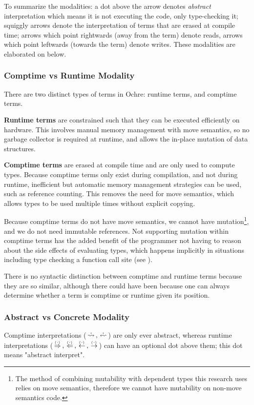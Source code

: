 \documentclass[12pt,twoside]{report}
\begin{document}
To summarize the modalities: a dot above the arrow denotes \textit{abstract} interpretation which means it is not executing the code, only type-checking it; squiggly arrows denote the interpretation of terms that are erased at compile time; arrows which point rightwards (away from the term) denote reads, arrows which point leftwards (towards the term) denote writes. These modalities are elaborated on below.

\subsubsection{Comptime vs Runtime Modality}
There are two distinct types of terms in Ochre: runtime terms, and comptime terms.

\textbf{Runtime terms} are constrained such that they can be executed efficiently on hardware. This involves manual memory management with move semantics, so no garbage collector is required at runtime, and allows the in-place mutation of data structures.

\textbf{Comptime terms} are erased at compile time and are only used to compute types. Because comptime terms only exist during compilation, and not during runtime, inefficient but automatic memory management strategies can be used, such as reference counting. This removes the need for move semantics, which allows types to be used multiple times without explicit copying.

Because comptime terms do not have move semantics, we cannot have mutation\footnote{The method of combining mutability with dependent types this research uses relies on move semantics, therefore we cannot have mutability on non-move semantics code.}, and we do not need immutable references. Not supporting mutation within comptime terms has the added benefit of the programmer not having to reason about the side effects of evaluating types, which happens implicitly in situations including type checking a function call site (see ).
 
There is no syntactic distinction between comptime and runtime terms because they are so similar, although there could have been because one can always determine whether a term is comptime or runtime given its position.

\subsubsection{Abstract vs Concrete Modality}
Comptime interpretations ($\erasedreadarrow, \erasedwritearrow$) are only ever abstract, whereas runtime interpretations ($\,\stackrel{_(._)}{\Rightarrow}\,, \,\stackrel{_(._)}{\Leftarrow}\,, \,\stackrel{_(._)}{\leftarrow}\,, \,\stackrel{_(._)}{\rightarrow}\,$) can have an optional dot above them; this dot means "abstract interpret".
\end{document}
